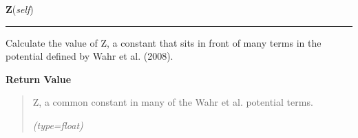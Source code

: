     \label{SatStress:SatStress:StressDef:Z}

    \vspace{0.5ex}

\hspace{.8\funcindent}\begin{boxedminipage}{\funcwidth}

    \raggedright \textbf{Z}(\textit{self})

    \vspace{-1.5ex}

    \rule{\textwidth}{0.5\fboxrule}
\setlength{\parskip}{2ex}
    Calculate the value of Z, a constant that sits in front of many terms 
    in the potential defined by Wahr et al. (2008).

\setlength{\parskip}{1ex}
      \textbf{Return Value}
    \vspace{-1ex}

      \begin{quote}
      Z, a common constant in many of the Wahr et al. potential terms.

      {\it (type=float)}

      \end{quote}

    \end{boxedminipage}

    \label{SatStress:SatStress:StressDef:mu_twiddle}

    \vspace{0.5ex}

